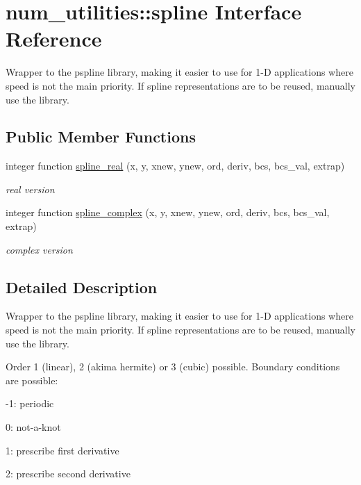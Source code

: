 \hypertarget{interfacenum__utilities_1_1spline}{}\section{num\+\_\+utilities\+:\+:spline Interface Reference}
\label{interfacenum__utilities_1_1spline}


Wrapper to the pspline library, making it easier to use for 1-\/D applications where speed is not the main priority. If spline representations are to be reused, manually use the library.  


\subsection*{Public Member Functions}
\begin{DoxyCompactItemize}
\item 
integer function \hyperlink{interfacenum__utilities_1_1spline_a4930f80a2527dde5f5fc32cc90c5c107}{spline\+\_\+real} (x, y, xnew, ynew, ord, deriv, bcs, bcs\+\_\+val, extrap)
\begin{DoxyCompactList}\small\item\em real version \end{DoxyCompactList}\item 
integer function \hyperlink{interfacenum__utilities_1_1spline_a02b3cc0c51d11a9b5d889f871e2d088f}{spline\+\_\+complex} (x, y, xnew, ynew, ord, deriv, bcs, bcs\+\_\+val, extrap)
\begin{DoxyCompactList}\small\item\em complex version \end{DoxyCompactList}\end{DoxyCompactItemize}


\subsection{Detailed Description}
Wrapper to the pspline library, making it easier to use for 1-\/D applications where speed is not the main priority. If spline representations are to be reused, manually use the library. 

Order 1 (linear), 2 (akima hermite) or 3 (cubic) possible. Boundary conditions are possible\+:
\begin{DoxyItemize}
\item -\/1\+: periodic
\item 0\+: not-\/a-\/knot
\item 1\+: prescribe first derivative
\item 2\+: prescribe second derivative
\end{DoxyItemize}

